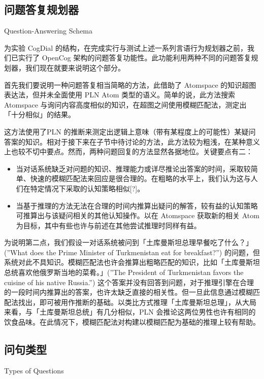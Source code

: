 \subsection{问题答复规划器}{Question-Answering Schema}
\label{sec:QA}

为实验 CogDial 的结构，在完成实行与测试上述一系列言语行为规划器之前，我们已实行了 OpenCog 架构的问题答复功能性。此功能利用两种不同的问题答复规划器，我们现在就要来说明这个部分。

首先我们要说明一种问题答复相当简略的方法，此借助了 Atomspace 的知识超图表达法，但并未全面使用 PLN Atom 类型的语义。简单的说，此方法搜索 Atomspace 与询问内容高度相似的知识，在超图之间使用模糊匹配法，测定出「十分相似」的结果。 

这方法使用了PLN 的推断来测定出逻辑上意味（带有某程度上的可能性）某疑问答案的知识。相对于接下来在子节中待讨论的方法，此方法较为粗浅，在某种意义上也较不切中要点。然而，两种问题回复的方法显然各据地位。关键要点有二：

\begin{itemize}
\item 当对话系统缺乏对问题的知识、推理能力或详尽推论出答案的时间，采取较简单、快速的模糊匹配法来回应是很合理的。在粗略的水平上，我们认为这与人们在特定情况下采取的认知策略相似[?]。 
\item 当基于推理的方法无法在合理的时间内推算出疑问的解答，较有益的认知策略可推算出与该疑问相关的其他认知操作。以在 Atomspace 获取新的相关 Atom 为目标，其中有些也许与前述在其他尝试推理时同样有益。
\end{itemize}

为说明第二点，我们假设一对话系统被问到「土库曼斯坦总理早餐吃了什么？」(”What does the Prime Minister of Turkmenistan eat for breakfast?”) 的问题，但系统对此不具知识。模糊匹配法也许会推算出粗略匹配的知识，比如「土库曼斯坦总统喜欢他俄罗斯当地的菜肴。」(”The President of Turkmenistan favors the cuisine of his native Russia.”) 这个答案并没有回答到问题，对于推理引擎在合理的一段时间内推算出的答案，也许太缺乏直接的相关性。但一旦此信息通过模糊匹配法找出，即可被用作推断的基础。以类比方式推理「土库曼斯坦总理」，从大局来看，与「土库曼斯坦总统」有几分相似，PLN 会推论这两位男性也许有相同的饮食品味。在此情况下，模糊匹配法对构建以模糊匹配为基础的推理上较有帮助。


\subsection{问句类型}{Types of Questions}

